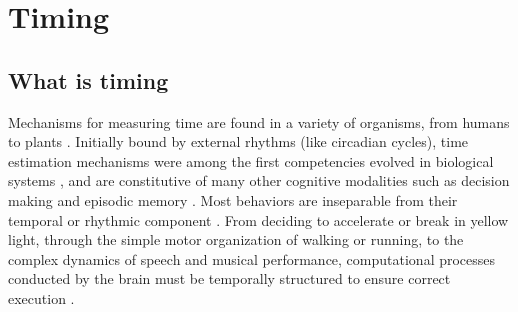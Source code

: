 \chapter{Timing}
\label{chap:timing}
\section{What is timing}

    Mechanisms for measuring time are found in a variety of organisms, from humans to plants \cite{cashmore2003cryptochromes}. Initially bound by external rhythms (like circadian cycles), time estimation mechanisms were among the first competencies evolved in biological systems \cite{paranjpe2005evolution}, and are constitutive of many other cognitive modalities such as decision making and episodic memory \cite{maniadakis2014time}. Most behaviors are inseparable from their temporal or rhythmic component \cite{buhusi2005makes}. From deciding to accelerate or break in yellow light, through the simple motor organization of walking or running, to the complex dynamics of speech and musical performance, computational processes conducted by the brain must be temporally structured to ensure correct execution \cite{bueti2014temporal}. 
    
